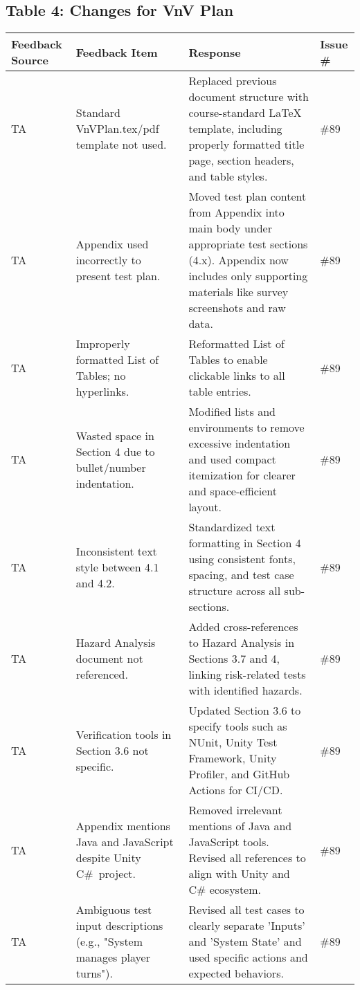 \documentclass{article}
\begin{document}
\subsection*{Table 4: Changes for VnV Plan}
\begin{longtable}{|p{2cm}|p{5cm}|p{5cm}|p{2cm}|}
\hline
\textbf{Feedback Source} & \textbf{Feedback Item} & \textbf{Response} & \textbf{Issue \#} \\
\hline
TA & Standard VnVPlan.tex/pdf template not used. & Replaced previous document structure with course-standard LaTeX template, including properly formatted title page, section headers, and table styles. & \#89 \\
\hline
TA & Appendix used incorrectly to present test plan. & Moved test plan content from Appendix into main body under appropriate test sections (4.x). Appendix now includes only supporting materials like survey screenshots and raw data. & \#89 \\
\hline
TA & Improperly formatted List of Tables; no hyperlinks. & Reformatted List of Tables to enable clickable links to all table entries. & \#89 \\
\hline
TA & Wasted space in Section 4 due to bullet/number indentation. & Modified lists and environments to remove excessive indentation and used compact itemization for clearer and space-efficient layout. & \#89 \\
\hline
TA & Inconsistent text style between 4.1 and 4.2. & Standardized text formatting in Section 4 using consistent fonts, spacing, and test case structure across all sub-sections. & \#89 \\
\hline
TA & Hazard Analysis document not referenced. & Added cross-references to Hazard Analysis in Sections 3.7 and 4, linking risk-related tests with identified hazards. & \#89 \\
\hline
TA & Verification tools in Section 3.6 not specific. & Updated Section 3.6 to specify tools such as NUnit, Unity Test Framework, Unity Profiler, and GitHub Actions for CI/CD. & \#89 \\
\hline
TA & Appendix mentions Java and JavaScript despite Unity C\#\ project. & Removed irrelevant mentions of Java and JavaScript tools. Revised all references to align with Unity and C# ecosystem. & \#89 \\
\hline
TA & Ambiguous test input descriptions (e.g., "System manages player turns"). & Revised all test cases to clearly separate 'Inputs' and 'System State' and used specific actions and expected behaviors. & \#89 \\

\end{longtable}
\end{document}
